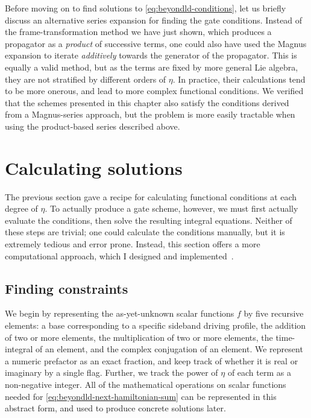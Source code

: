 Before moving on to find solutions to \cref{eq:beyondld-conditions}, let us briefly discuss an alternative series expansion for finding the gate conditions.
Instead of the frame-transformation method we have just shown, which produces a propagator as a \emph{product} of successive terms, one could also have used the Magnus expansion to iterate \emph{additively} towards the generator of the propagator.
This is equally a valid method, but as the terms are fixed by more general Lie algebra, they are not stratified by different orders of $\eta$.
In practice, their calculations tend to be more onerous, and lead to more complex functional conditions.
We verified that the schemes presented in this chapter also satisfy the conditions derived from a Magnus-series approach, but the problem is more easily tractable when using the product-based series described above.


\section{Calculating solutions}

The previous section gave a recipe for calculating functional conditions at each degree of $\eta$.
To actually produce a gate scheme, however, we must first actually evaluate the conditions, then solve the resulting integral equations.
Neither of these steps are trivial; one could calculate the conditions manually, but it is extremely tedious and error prone.
Instead, this section offers a more computational approach, which I designed and implemented~\cite{Sameti2021Code}.

\subsection{Finding constraints}

We begin by representing the as-yet-unknown scalar functions $f$ by five recursive elements: a base corresponding to a specific sideband driving profile, the addition of two or more elements, the multiplication of two or more elements, the time-integral of an element, and the complex conjugation of an element.
We represent a numeric prefactor as an exact fraction, and keep track of whether it is real or imaginary by a single flag.
Further, we track the power of $\eta$ of each term as a non-negative integer.
All of the mathematical operations on scalar functions needed for \cref{eq:beyondld-next-hamiltonian-sum} can be represented in this abstract form, and used to produce concrete solutions later.

